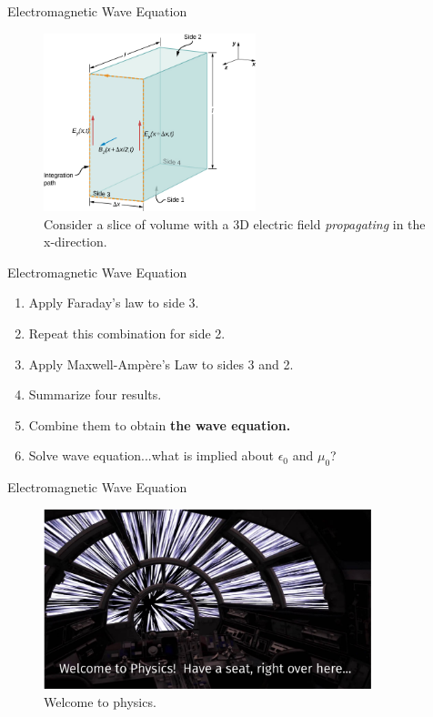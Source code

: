 \documentclass{beamer}
\begin{document}
\begin{frame}{Electromagnetic Wave Equation}
\begin{figure}
\centering
\includegraphics[width=0.55\textwidth]{figures/wave2.jpeg}
\caption{\label{fig:wave2} Consider a slice of volume with a 3D electric field \textit{propagating} in the x-direction.}
\end{figure}
\end{frame}

\begin{frame}{Electromagnetic Wave Equation}
\begin{enumerate}
\item Apply Faraday's law to side 3.
\item Repeat this combination for side 2.
\item Apply Maxwell-Amp\`{e}re's Law to sides 3 and 2.
\item Summarize four results.
\item Combine them to obtain \textbf{the wave equation.}
\item Solve wave equation...what is implied about $\epsilon_0$ and $\mu_0$?
\end{enumerate}
\end{frame}

\begin{frame}{Electromagnetic Wave Equation}
\begin{figure}
\centering
\includegraphics[width=0.85\textwidth]{figures/hyper.pdf}
\caption{\label{fig:hyper} Welcome to physics.}
\end{figure}
\end{frame}
\end{document}

